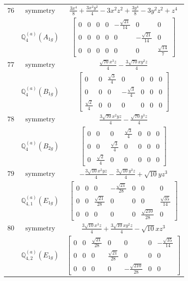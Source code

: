 \documentclass[fleqn,8pt,landscape]{jsarticle}
\begin{document}
\begin{longtable}{ccc}
$ 76 $ & $ \text{symmetry} $ & $ \frac{3 x^{4}}{8} + \frac{3 x^{2} y^{2}}{4} - 3 x^{2} z^{2} + \frac{3 y^{4}}{8} - 3 y^{2} z^{2} + z^{4} $ \\
$  $ & $ \mathbb{Q}_{4}^{(a)}(A_{1g}) $ & $ \begin{bmatrix} 0 & 0 & 0 & 0 & - \frac{\sqrt{21}}{14} & 0 & 0 \\ 0 & 0 & 0 & 0 & 0 & - \frac{\sqrt{21}}{14} & 0 \\ 0 & 0 & 0 & 0 & 0 & 0 & \frac{\sqrt{14}}{7} \end{bmatrix} $ \\ \hline
$ 77 $ & $ \text{symmetry} $ & $ \frac{\sqrt{70} x^{3} z}{4} - \frac{3 \sqrt{70} x y^{2} z}{4} $ \\
$  $ & $ \mathbb{Q}_{4}^{(a)}(B_{1g}) $ & $ \begin{bmatrix} 0 & 0 & \frac{\sqrt{3}}{4} & 0 & 0 & 0 & 0 \\ 0 & 0 & 0 & - \frac{\sqrt{3}}{4} & 0 & 0 & 0 \\ \frac{\sqrt{2}}{4} & 0 & 0 & 0 & 0 & 0 & 0 \end{bmatrix} $ \\ \hline
$ 78 $ & $ \text{symmetry} $ & $ \frac{3 \sqrt{70} x^{2} y z}{4} - \frac{\sqrt{70} y^{3} z}{4} $ \\
$  $ & $ \mathbb{Q}_{4}^{(a)}(B_{2g}) $ & $ \begin{bmatrix} 0 & 0 & 0 & \frac{\sqrt{3}}{4} & 0 & 0 & 0 \\ 0 & 0 & \frac{\sqrt{3}}{4} & 0 & 0 & 0 & 0 \\ 0 & \frac{\sqrt{2}}{4} & 0 & 0 & 0 & 0 & 0 \end{bmatrix} $ \\ \hline
$ 79 $ & $ \text{symmetry} $ & $ - \frac{3 \sqrt{10} x^{2} y z}{4} - \frac{3 \sqrt{10} y^{3} z}{4} + \sqrt{10} y z^{3} $ \\
$  $ & $ \mathbb{Q}_{4,1}^{(a)}(E_{1g}) $ & $ \begin{bmatrix} 0 & 0 & 0 & - \frac{\sqrt{21}}{28} & 0 & 0 & 0 \\ 0 & 0 & \frac{\sqrt{21}}{28} & 0 & 0 & 0 & \frac{\sqrt{35}}{14} \\ 0 & 0 & 0 & 0 & 0 & \frac{\sqrt{210}}{28} & 0 \end{bmatrix} $ \\ \hline
$ 80 $ & $ \text{symmetry} $ & $ \frac{3 \sqrt{10} x^{3} z}{4} + \frac{3 \sqrt{10} x y^{2} z}{4} - \sqrt{10} x z^{3} $ \\
$  $ & $ \mathbb{Q}_{4,2}^{(a)}(E_{1g}) $ & $ \begin{bmatrix} 0 & 0 & \frac{\sqrt{21}}{28} & 0 & 0 & 0 & - \frac{\sqrt{35}}{14} \\ 0 & 0 & 0 & \frac{\sqrt{21}}{28} & 0 & 0 & 0 \\ 0 & 0 & 0 & 0 & - \frac{\sqrt{210}}{28} & 0 & 0 \end{bmatrix} $ \\ \hline

\end{longtable}
\end{document}
